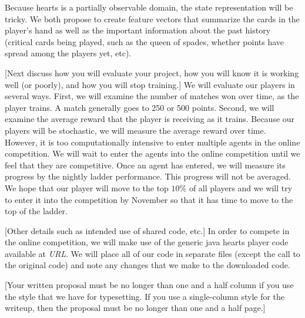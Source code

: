 \documentclass[nohyperref]{article}
\theoremstyle{plain}
\theoremstyle{definition}
\theoremstyle{remark}
\newcommand{\cnote}[1]{\textsf{\color{blue} [#1]}}
\begin{document}
Because hearts is a partially observable domain, the state representation will be tricky.  We both propose to create feature vectors that summarize the cards in the player's hand as well as the important information about the past history (critical cards being played, such as the queen of spades, whether points have spread among the players yet, etc).  

\cnote{Next discuss how you will evaluate your project, how you will know it is working well (or poorly), and how you will stop training.}  We will evaluate our players in several ways.  First, we will examine the number of matches won over time, as the player trains.  A match generally goes to 250 or 500 points.  Second, we will examine the average reward that the player is receiving as it trains.  Because our players will be stochastic, we will measure the average reward over time.  However, it is too computationally intensive to enter multiple agents in the online competition.  We will wait to enter the agents into the online competition until we feel that they are competitive.  Once an agent has entered, we will measure its progress by the nightly ladder performance.  This progress will not be averaged.  We hope that our player will move to the top $10\%$ of all players and we will try to enter it into the competition by November so that it has time to move to the top of the ladder.

\cnote{Other details such as intended use of shared code, etc.}  In order to compete in the online competition, we will make use of the generic java hearts player code available at \textit{URL}.  We will place all of our code in separate files (except the call to the original code) and note any changes that we make to the downloaded code.  

\cnote{Your written proposal must be no longer than one and a half column if you use the style that we have for typesetting.  If you use a single-column style for the writeup, then the proposal must be no longer than one and a half page.}




\end{document}

